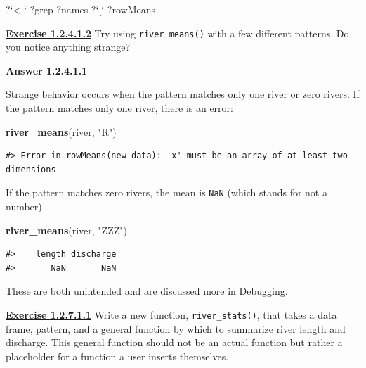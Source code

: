\documentclass[
]{book}
\newenvironment{Shaded}{\begin{snugshade}}{\end{snugshade}}
\newcommand{\DataTypeTok}[1]{\textcolor[rgb]{0.13,0.29,0.53}{#1}}
\newcommand{\KeywordTok}[1]{\textcolor[rgb]{0.13,0.29,0.53}{\textbf{#1}}}
\newcommand{\NormalTok}[1]{#1}
\newcommand{\StringTok}[1]{\textcolor[rgb]{0.31,0.60,0.02}{#1}}
\begin{document}
\begin{Shaded}
\begin{Highlighting}[]
\NormalTok{?}\StringTok{`}\DataTypeTok{<-}\StringTok{`}
\NormalTok{?grep}
\NormalTok{?names}
\NormalTok{?}\StringTok{`}\DataTypeTok{[}\StringTok{`}
\NormalTok{?rowMeans}
\end{Highlighting}
\end{Shaded}

\textbf{\protect\hyperlink{ex-set2}{Exercise 1.2.4.1.2}} Try using \texttt{river\_means()} with a few different patterns. Do you notice anything strange?

\textbf{Answer 1.2.4.1.1}

Strange behavior occurs when the pattern matches only one river or zero rivers. If the pattern matches only one river, there is an error:

\begin{Shaded}
\begin{Highlighting}[]
\KeywordTok{river_means}\NormalTok{(river, }\StringTok{"R"}\NormalTok{)}
\end{Highlighting}
\end{Shaded}

\begin{verbatim}
#> Error in rowMeans(new_data): 'x' must be an array of at least two dimensions
\end{verbatim}

If the pattern matches zero rivers, the mean is \texttt{NaN} (which stands for not a number)

\begin{Shaded}
\begin{Highlighting}[]
\KeywordTok{river_means}\NormalTok{(river, }\StringTok{"ZZZ"}\NormalTok{)}
\end{Highlighting}
\end{Shaded}

\begin{verbatim}
#>    length discharge 
#>       NaN       NaN
\end{verbatim}

These are both unintended and are discussed more in \protect\hyperlink{debugging}{Debugging}.

\textbf{\protect\hyperlink{ex-set3}{Exercise 1.2.7.1.1}} Write a new function, \texttt{river\_stats()}, that takes a data frame, pattern, and a general function by which to summarize river length and discharge. This general function should not be an actual function but rather a placeholder for a function a user inserts themselves.
\end{document}
